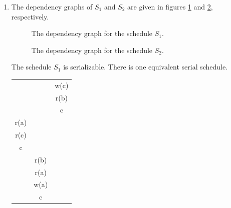 \documentclass{article}
\begin{document}
\begin{enumerate}
    \item
        The dependency graphs of $S_1$ and $S_2$ are given in figures
        \ref{fig:dependency-graph-s1} and \ref{fig:dependency-graph-s2},
        respectively.

        \begin{figure}[ht]
            \centering
            \caption{The dependency graph for the schedule $S_1$.}
            \label{fig:dependency-graph-s1}
        \end{figure}

        \begin{figure}[ht]
            \centering
            \caption{The dependency graph for the schedule $S_2$.}
            \label{fig:dependency-graph-s2}
        \end{figure}

        The schedule $S_1$ is serializable. There is one equivalent serial
        schedule.

        \begin{center}
            \begin{tabular}{c | c | c}
                &      & w(c) \\
                &      & r(b) \\
                &      & c \\
                r(a) &      & \\
                r(c) &      & \\
                c    &      & \\
                     & r(b) & \\
                     & r(a) & \\
                     & w(a) & \\
                     & c    &
            \end{tabular}
        \end{center}


\end{enumerate}
\end{document}
